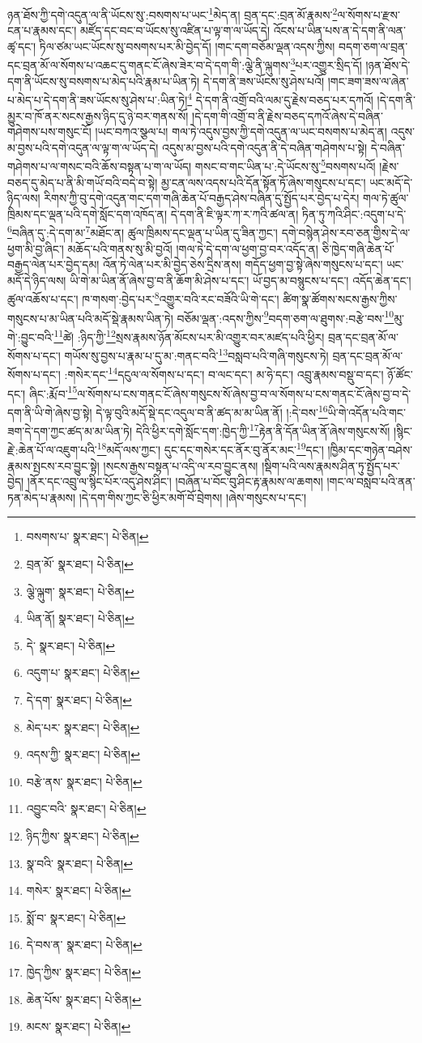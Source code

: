 ཉན་ཐོས་ཀྱི་དགེ་འདུན་ལ་ནི་ཡོངས་སུ་:བསགས་པ་ཡང་\footnote{བསགས་པ་  སྣར་ཐང་།  པེ་ཅིན། }མེད་ན། བྲན་དང་:བྲན་མོ་རྣམས་\footnote{བྲན་མོ་  སྣར་ཐང་།  པེ་ཅིན། }ལ་སོགས་པ་རྫས་ངན་པ་རྣམས་དང་། མཛོད་དང་བང་བ་ཡོངས་སུ་འཛིན་པ་ལྟ་ག་ལ་ཡོད་དེ། འོངས་པ་ཡིན་པས་ན་དེ་དག་ནི་ལན་ཚྭ་དང་། ཏིལ་ཙམ་ཡང་ཡོངས་སུ་བསགས་པར་མི་བྱེད་དོ། །གང་དག་བཅོམ་ལྡན་འདས་ཀྱིས། བདག་ཅག་ལ་བྲན་དང་བྲན་མོ་ལ་སོགས་པ་འཆང་དུ་གནང་ངོ་ཞེས་ཟེར་བ་དེ་དག་གི་:ལྕེ་ནི་ལྐུགས་\footnote{ལྕེ་ལྐུག་  སྣར་ཐང་།  པེ་ཅིན། }པར་འགྱུར་སྲིད་དོ། །ཉན་ཐོས་དེ་དག་ནི་ཡོངས་སུ་བསགས་པ་མེད་པའི་རྣམ་པ་ཡིན་ཏེ། དེ་དག་ནི་ཟས་ཡོངས་སུ་ཤེས་པའོ། །གང་ཟག་ཟས་ལ་ཞེན་པ་མེད་པ་དེ་དག་ནི་ཟས་ཡོངས་སུ་ཤེས་པ་:ཡིན་ཏེ།\footnote{ཡིན་ནོ།  སྣར་ཐང་།  པེ་ཅིན། } དེ་དག་ནི་འགྲོ་བའི་ལམ་དུ་རྗེས་བཅད་པར་དཀའོ། །དེ་དག་ནི་མྱུར་བ་ཁོ་ནར་སངས་རྒྱས་ཉིད་དུ་ཉེ་བར་གནས་སོ། །དེ་དག་གི་འགྲོ་བ་ནི་རྗེས་བཅད་དཀའོ་ཞེས་དེ་བཞིན་གཤེགས་པས་གསུང་ངོ། །ཡང་བཀའ་སྩལ་པ། གལ་ཏེ་འདུས་བྱས་ཀྱི་དགེ་འདུན་ལ་ཡང་བསགས་པ་མེད་ན། འདུས་མ་བྱས་པའི་དགེ་འདུན་ལ་ལྟ་ག་ལ་ཡོད་དེ། འདུས་མ་བྱས་པའི་དགེ་འདུན་ནི་དེ་བཞིན་གཤེགས་པ་སྟེ། དེ་བཞིན་གཤེགས་པ་ལ་གསང་བའི་ཆོས་བསྟན་པ་ག་ལ་ཡོད། གསང་བ་གང་ཡིན་པ་:དེ་ཡོངས་སུ་\footnote{དེ་  སྣར་ཐང་།  པེ་ཅིན། }བསགས་པའོ། །རྗེས་བཅད་དུ་མེད་པ་ནི་མི་གཡོ་བའི་བདེ་བ་སྟེ། མྱ་ངན་ལས་འདས་པའི་དོན་སྟོན་ཏོ་ཞེས་གསུངས་པ་དང་། ཡང་མདོ་དེ་ཉིད་ལས། རིགས་ཀྱི་བུ་དགེ་འདུན་གང་དག་གཞི་ཆེན་པོ་བརྒྱད་ཤེས་བཞིན་དུ་སྤྱོད་པར་བྱེད་པ་དེར། གལ་ཏེ་ཚུལ་ཁྲིམས་དང་ལྡན་པའི་དགེ་སློང་དག་འཁོད་ན། དེ་དག་ནི་ཇི་ལྟར་ཀ་ར་ཀའི་ཚལ་ན། ཏིན་ཏུ་ཀའི་ཤིང་:འདུག་པ་དེ་\footnote{འདུག་པ་  སྣར་ཐང་།  པེ་ཅིན། }བཞིན་དུ་:དེ་དག་མ་\footnote{དེ་དག་  སྣར་ཐང་།  པེ་ཅིན། }མཐོང་ན། ཚུལ་ཁྲིམས་དང་ལྡན་པ་ཡིན་དུ་ཟིན་ཀྱང་། དགེ་བསྙེན་ཤེས་རབ་ཅན་གྱིས་དེ་ལ་ཕྱག་མི་བྱ་ཞིང་། མཆོད་པའི་གནས་སུ་མི་བྱའོ། །གལ་ཏེ་དེ་དག་ལ་ཕྱག་བྱ་བར་འདོད་ན། ཅི་ཁྱེད་གཞི་ཆེན་པོ་བརྒྱད་ལེན་པར་བྱེད་དམ། འོན་ཏེ་ལེན་པར་མི་བྱེད་ཅེས་དྲིས་ནས། གདོད་ཕྱག་བྱ་སྟེ་ཞེས་གསུངས་པ་དང་། ཡང་མདོ་དེ་ཉིད་ལས། ཡི་གེ་མ་ཡིན་ནོ་ཞེས་བྱ་བ་ནི་ཆོག་མི་ཤེས་པ་དང་། ཡོ་བྱད་མ་བསྙུངས་པ་དང་། འདོད་ཆེན་དང་། ཚུལ་འཆོས་པ་དང་། ཁ་གསག་:བྱེད་པར་\footnote{མེད་པར་  སྣར་ཐང་།  པེ་ཅིན། }འགྱུར་བའི་རང་བཟོའི་ཡི་གེ་དང་། ཚིག་སྣ་ཚོགས་སངས་རྒྱས་ཀྱིས་གསུངས་པ་མ་ཡིན་པའི་མདོ་སྡེ་རྣམས་ཡིན་ཏེ། བཅོམ་ལྡན་:འདས་ཀྱིས་\footnote{འདས་ཀྱི་  སྣར་ཐང་།  པེ་ཅིན། }བདག་ཅག་ལ་ཐུགས་:བརྩེ་བས་\footnote{བརྩེ་ནས་  སྣར་ཐང་།  པེ་ཅིན། }མུ་གེ་:བྱུང་བའི་\footnote{འབྱུང་བའི་  སྣར་ཐང་།  པེ་ཅིན། }ཚེ། :ཉིད་ཀྱི་\footnote{ཉིད་ཀྱིས་  སྣར་ཐང་།  པེ་ཅིན། }སྲས་རྣམས་ཉོན་མོངས་པར་མི་འགྱུར་བར་མཛད་པའི་ཕྱིར། བྲན་དང་བྲན་མོ་ལ་སོགས་པ་དང་། གཡོས་སུ་བྱས་པ་རྣམ་པ་དུ་མ་:གནང་བའི་\footnote{སྣ་བའི་  སྣར་ཐང་།  པེ་ཅིན། }བསླབ་པའི་གཞི་གསུངས་ཏེ། བྲན་དང་བྲན་མོ་ལ་སོགས་པ་དང་། :གསེར་དང་\footnote{གསེར་  སྣར་ཐང་།  པེ་ཅིན། }དངུལ་ལ་སོགས་པ་དང་། བ་ལང་དང་། མ་ཧེ་དང་། འབྲུ་རྣམས་བསྡུ་བ་དང་། ཉོ་ཚོང་དང་། ཞིང་:རྨོ་བ་\footnote{སྨོ་བ་  སྣར་ཐང་།  པེ་ཅིན། }ལ་སོགས་པ་ངས་གནང་ངོ་ཞེས་གསུངས་སོ་ཞེས་བྱ་བ་ལ་སོགས་པ་ངས་གནང་ངོ་ཞེས་བྱ་བ་དེ་དག་ནི་ཡི་གེ་ཞེས་བྱ་སྟེ། དེ་ལྟ་བུའི་མདོ་སྡེ་དང་འདུལ་བ་ནི་ཚད་མ་མ་ཡིན་ནོ། །:དེ་བས་\footnote{དེ་བས་ན་  སྣར་ཐང་།  པེ་ཅིན། }ཡི་གེ་འདོན་པའི་གང་ཟག་དེ་དག་ཀྱང་ཚད་མ་མ་ཡིན་ཏེ། དེའི་ཕྱིར་དགེ་སློང་དག་:ཁྱེད་ཀྱི་\footnote{ཁྱེད་ཀྱིས་  སྣར་ཐང་།  པེ་ཅིན། }རྟེན་ནི་དོན་ཡིན་ནོ་ཞེས་གསུངས་སོ། །སྙིང་རྗེ་:ཆེན་པོ་ལ་འཇུག་པའི་\footnote{ཆེན་པོས་  སྣར་ཐང་།  པེ་ཅིན། }མདོ་ལས་ཀྱང་། དུང་དང་གསེར་དང་ནོར་བུ་ནོར་མང་\footnote{མངས་  སྣར་ཐང་།  པེ་ཅིན། }དང་། །ཁྱིམ་དང་གཉེན་བཤེས་རྣམས་སྤངས་རབ་བྱུང་སྟེ། །སངས་རྒྱས་བསྟན་པ་འདི་ལ་རབ་བྱུང་ནས། །སྡིག་པའི་ལས་རྣམས་ཤིན་ཏུ་སྤྱོད་པར་བྱེད། །ནོར་དང་འབྲུ་ལ་སྙིང་པོར་འདུ་ཤེས་ཤིང་། །བཞོན་པ་བོང་བུ་ཤིང་རྟ་རྣམས་ལ་ཆགས། །གང་ལ་བསླབ་པའི་ནན་ཏན་མེད་པ་རྣམས། །དེ་དག་གིས་ཀྱང་ཅི་ཕྱིར་མགོ་བོ་བྲེགས། །ཞེས་གསུངས་པ་དང་། 